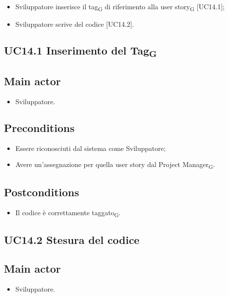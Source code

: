 \documentclass{article}
\begin{document}
        \begin{itemize}
            \item Sviluppatore inserisce il tag\textsubscript{G} di riferimento alla user story\textsubscript{G} [UC14.1];
            \item Sviluppatore scrive del codice [UC14.2].
        \end{itemize}

        \subsection{UC14.1 Inserimento del Tag\textsubscript{G}}
\subsection*{Main actor}
        \begin{itemize}
            \item Sviluppatore.
        \end{itemize}
    
    \subsection*{Preconditions}
        \begin{itemize}
            \item Essere riconosciuti dal sistema come Sviluppatore;
            \item Avere un'assegnazione per quella user story dal Project Manager\textsubscript{G}.
        \end{itemize}
        
    \subsection*{Postconditions} 
        \begin{itemize}
            \item Il codice è correttamente taggato\textsubscript{G}.
        \end{itemize}

        
        \subsection{UC14.2 Stesura del codice}
\subsection*{Main actor}
        \begin{itemize}
            \item Sviluppatore.
        \end{itemize}
    
\end{document}
